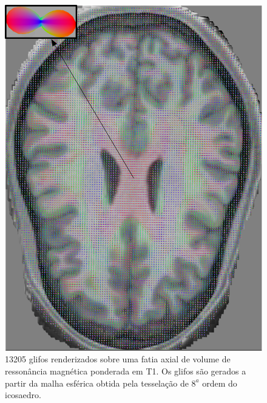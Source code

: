   \begin{figure}[H]
     \centering
     \includegraphics[width=1.0\linewidth, angle=0]{figs/Renderizacao_glifos_evolucao/Adaptividade-multimodal/Fatia_glifo_tf_642.png}
      \caption{13205 glifos renderizados sobre uma fatia axial de volume de ressonância magnética ponderada em T1. Os glifos são gerados a partir da malha esférica obtida pela tesselação de $8^a$ ordem do icosaedro.}
       \label{fig::qualidade_visual_longe_highres}
 \end{figure}

